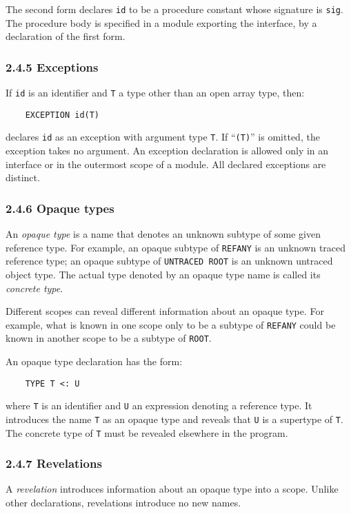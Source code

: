 \documentclass[10pt]{article}
\begin{document}
The second form declares \verb|id| to be a procedure constant whose signature
is \verb|sig|.  The procedure body is specified in a module exporting the
interface, by a declaration of the first form.

\subsubsection*{2.4.5 Exceptions}

If \verb|id| is an identifier and \verb|T| a type other than an open array
type, then:
\begin{verbatim}
    EXCEPTION id(T)
\end{verbatim}
declares \verb|id| as an exception with argument type \verb|T|.  If
``\verb|(T)|'' is omitted, the exception takes no argument.  An exception
declaration is allowed only in an interface or in the outermost scope of a
module.  All declared exceptions are distinct.

\subsubsection*{2.4.6 Opaque types}

An \emph{opaque type} is a name that denotes an unknown subtype of some given
reference type.  For example, an opaque subtype of \verb|REFANY| is an unknown
traced reference type; an opaque subtype of \verb|UNTRACED ROOT| is an unknown
untraced object type.  The actual type denoted by an opaque type name is
called its \emph{concrete type}.

Different scopes can reveal different information about an opaque type.  For
example, what is known in one scope only to be a subtype of \verb|REFANY|
could be known in another scope to be a subtype of \verb|ROOT|.

An opaque type declaration has the form:
\begin{verbatim}
    TYPE T <: U
\end{verbatim}
where \verb|T| is an identifier and \verb|U| an expression denoting a
reference type.  It introduces the name \verb|T| as an opaque type and reveals
that \verb|U| is a supertype of \verb|T|.  The concrete type of \verb|T| must
be revealed elsewhere in the program.

\subsubsection*{2.4.7 Revelations}

A \emph{revelation} introduces information about an opaque type into a scope.
Unlike other declarations, revelations introduce no new names.
\end{document}
